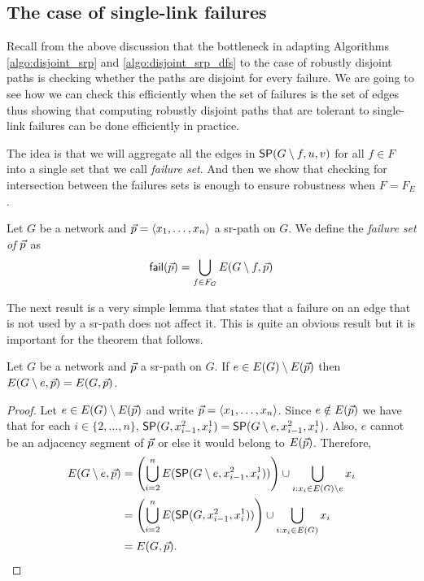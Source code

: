 \subsection{The case of single-link failures}

Recall from the above discussion that the bottleneck in adapting 
Algorithms \ref{algo:disjoint_srp} and \ref{algo:disjoint_srp_dfs} to the case of 
robustly disjoint paths is checking whether the paths are disjoint for every failure.
We are going to see how we can check this efficiently when the set of failures is the 
set of edges thus showing that computing robustly disjoint paths that are tolerant to 
single-link failures can be done efficiently in practice.

The idea is that we will aggregate all the edges in $\sp(G \setminus f, u, v)$ for all $f \in F$
into a single set that we call \emph{failure set}. And then we show that checking for intersection
between the failures sets is enough to ensure robustness when $F = F_E$.

\begin{definition}
Let $G$ be a network and $\sr{p} = \langle x_1, \ldots, x_n \rangle$ a sr-path on $G$. We define the \emph{failure set of $\sr{p}$}
as
$$
\fail(\sr{p}) = \bigcup_{f \in F_G} E(G \setminus f, \sr{p})
$$
\end{definition}

The next result is a very simple lemma that states that a failure on an edge that is not used by a sr-path does not affect it. This is quite an
obvious result but it is important for the theorem that follows.

\begin{lemma}
\label{lemma:outside-edge}
Let $G$ be a network and $\sr{p}$ a sr-path on $G$. If $e \in E(G) \setminus E(\sr{p})$ then $E(G \setminus e, \sr{p}) = E(G, \sr{p})$.
\end{lemma}

\begin{proof}
Let $e \in E(G) \setminus E(\sr{p})$ and write $\sr{p} = \langle x_1, \ldots, x_n \rangle$. Since $e \notin E(\sr{p})$ we have 
that for each $i \in \{2, \ldots, n\}$, $\sp(G, x^2_{i - 1}, x^1_{i}) = \sp(G \setminus e, x^2_{i - 1}, x^1_{i})$. Also, $e$ cannot be an
adjacency segment of $\sr{p}$ or else it would belong to $E(\sr{p})$. Therefore,
\begin{align*}
E(G \setminus e, \sr{p}) & = \left( \bigcup_{i = 2}^n E(\sp(G \setminus e, x^2_{i - 1}, x^1_i)) \right) \cup \bigcup_{i : x_i \in E(G) \setminus e} x_i \\
& = \left( \bigcup_{i = 2}^n E(\sp(G, x^2_{i - 1}, x^1_i)) \right) \cup \bigcup_{i : x_i \in E(G) } x_i \\
& = E(G, \sr{p}).
\end{align*}
\end{proof}

